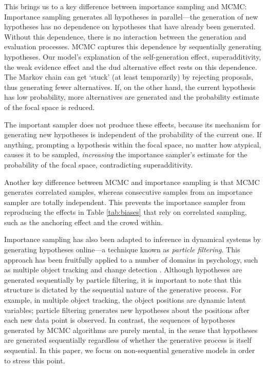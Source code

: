 This brings us to a key difference between importance sampling and MCMC: Importance sampling generates all hypotheses in parallel---the generation of new hypotheses has no dependence on hypotheses that have already been generated. Without this dependence, there is no interaction between the generation and evaluation processes. MCMC captures this dependence by sequentially generating hypotheses. Our model's explanation of the self-generation effect, superadditivity, the weak evidence effect and the dud alternative effect rests on this dependence. The Markov chain can get `stuck' (at least temporarily) by rejecting proposals, thus generating fewer alternatives. If, on the other hand, the current hypothesis has low probability, more alternatives are generated and the probability estimate of the focal space is reduced.

The important sampler does not produce these effects, because its mechanism for generating new hypotheses is independent of the probability of the current one. If anything, prompting a hypothesis within the focal space, no matter how atypical, causes it to be sampled, \textit{increasing} the importance sampler's estimate for the probability of the focal space, contradicting superadditivity.

Another key difference between MCMC and importance sampling is that MCMC generates correlated samples, whereas consecutive samples from an importance sampler are totally independent. This prevents the importance sampler from reproducing the effects in Table \ref{tab:biases} that rely on correlated sampling, such as the anchoring effect and the crowd within.

Importance sampling has also been adapted to inference in dynamical systems by generating hypotheses online---a technique known as \emph{particle filtering}. This approach has been fruitfully applied to a number of domains in psychology, such as multiple object tracking \citep{vul2009explaining} and change detection \citep{brown09}. Although hypotheses are generated sequentially by particle filtering, it is important to note that this structure is dictated by the sequential nature of the generative process. For example, in multiple object tracking, the object positions are dynamic latent variables; particle filtering generates new hypotheses about the positions after each new data point is observed. In contrast, the sequences of hypotheses generated by MCMC algorithms are purely mental, in the sense that hypotheses are generated sequentially regardless of whether the generative process is itself sequential. In this paper, we focus on non-sequential generative models in order to stress this point.

